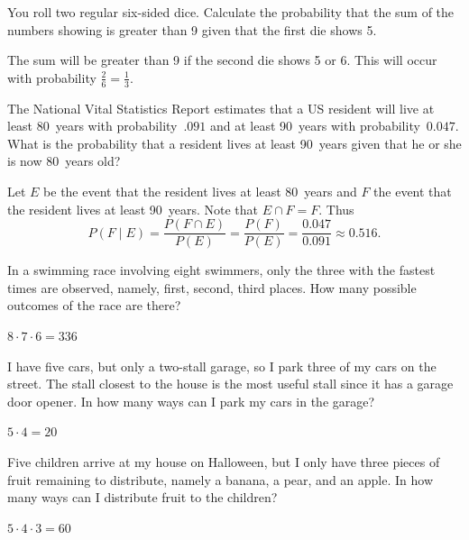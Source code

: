 \documentclass[answers,12pt]{exam}
\begin{document}
\begin{questions}
\question You roll two regular six-sided dice. Calculate the probability
that the sum of the numbers showing is greater than 9 given that
the first die shows 5.
\begin{solution} The sum will be greater than 9 if the second die
shows 5 or 6.
This will occur with probability $\frac{2}{6}=\frac{1}{3}$.
\end{solution}

\question The National Vital Statistics Report estimates
that a US resident will live at least 80~years with probability~$.091$
and at least 90~years with probability~$0.047$.
What is the probability that a resident lives at least 90~years
given that he or she is now 80~years old?
\begin{solution}
Let $E$ be the event that the resident lives at least 80~years
and $F$ the event that the resident lives at least 90~years.
Note that $E\cap F=F$. Thus
\[P\left(F\mid E\right)
=\frac{P\left(F\cap E\right)}{P\left(E\right)}
=\frac{P\left(F\right)}{P\left(E\right)}
=\frac{0.047}{0.091}\approx 0.516.\]
\end{solution}

\question In a swimming race involving eight swimmers, only the three
with the fastest times are observed,
namely, first, second, third places.
How many possible outcomes of the race are there?
\begin{solution} $8\cdot 7\cdot 6=336$ \end{solution}

\question I have five cars, but only a two-stall garage, so I
park three of my cars on the street. 
The stall closest to the house is the most useful stall since
it has a garage door opener. In how many
ways can I park my cars in the garage?
\begin{solution}$5\cdot 4=20$\end{solution}

\question Five children arrive at my house on Halloween,
but I only have three pieces of fruit remaining to distribute, namely
a banana, a pear, and an apple. In how many ways can I distribute
fruit to the children?
\begin{solution} $5\cdot 4\cdot 3=60$\end{solution}

\question
{}
\end{questions}
\end{document}
